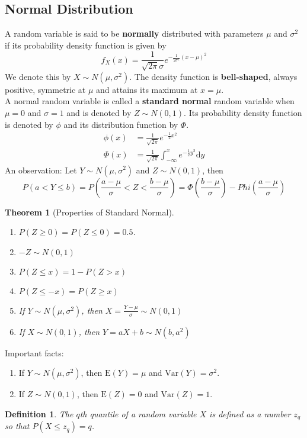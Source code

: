 \documentclass[12pt]{article}
\newcommand{\diff}{\mathrm{d}}
\newcommand{\var}{\mathrm{Var}}
\newcommand{\expec}{\mathrm{E}}
\newtheorem{definition}{Definition}[section]
\newtheorem{theorem}{Theorem}[section]
\theoremstyle{definition}
\begin{document}
\subsection{Normal Distribution}
A random variable is said to be \textbf{normally} distributed with parameters $\mu$ and $\sigma^2$ if its probability density function is given by
\[
f_X(x)=\frac{1}{\sqrt{2\pi}\sigma}e^{-\frac{1}{2\sigma^2}(x-\mu)^2}
\]
We denote this by $X\sim N(\mu, \sigma^2)$.
The density function is \textbf{bell-shaped}, always positive, symmetric at $\mu$ and attains its maximum at $x=\mu$.\\
A normal random variable is called a \textbf{standard normal} random variable when $\mu=0$ and $\sigma=1$ and is denoted by $Z\sim N(0,1)$. Its probability density function is denoted by $\phi$ and its distribution function by $\Phi$. 
\[
\begin{aligned}
\phi(x)&=\frac{1}{\sqrt{2\pi}}e^{-\frac{1}{2}x^2}\\
\Phi(x)&=\frac{1}{\sqrt{2\pi}}\int_{-\infty}^x e^{-\frac{1}{2}y^2}\diff y
\end{aligned}
\]
An observation: Let $Y\sim N(\mu,\sigma^2)$ and $Z\sim N(0,1)$, then
\[
P(a<Y\leq b) =P\left(\frac{a-\mu}{\sigma}<Z<\frac{b-\mu}{\sigma}\right) = \Phi\left(\frac{b-\mu}{\sigma}\right)-Phi\left(\frac{a-\mu}{\sigma}\right)
\]
\begin{theorem}[Properties of Standard Normal]
\begin{enumerate}
\item $P(Z\geq 0) = P(Z\leq 0) = 0.5$.
\item $-Z\sim N(0,1)$
\item $P(Z\leq x) = 1-P(Z>x)$
\item $P(Z\leq -x) = P(Z\geq x)$
\item If $Y\sim N(\mu, \sigma^2)$, then $X=\frac{Y-\mu}{\sigma}\sim N(0,1)$
\item If $X\sim N(0,1)$, then $Y=aX+b\sim N(b,a^2)$
\end{enumerate}
\end{theorem}
Important facts:
\begin{enumerate}
\item If $Y\sim N(\mu,\sigma^2)$, then $\expec(Y)=\mu$ and $\var(Y)=\sigma^2$.
\item If $Z\sim N(0,1)$, then $\expec(Z)=0$ and $\var(Z)=1$.
\end{enumerate}
\begin{definition}\normalfont The $q$th quantile of a random variable $X$ is defined as a number $z_q$ so that $P(X\leq z_q) = q$.
\end{definition}
\end{document}
